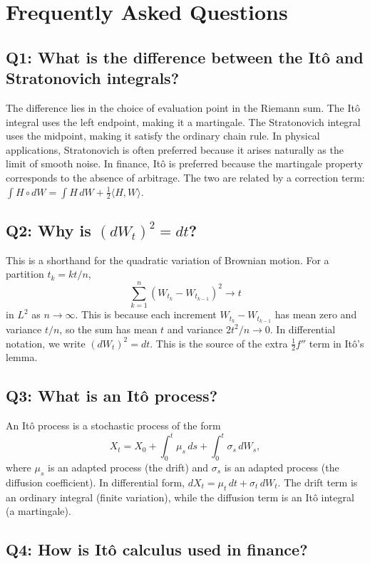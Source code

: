 \section{Frequently Asked Questions}

\subsection*{Q1: What is the difference between the It\^{o} and Stratonovich integrals?}

The difference lies in the choice of evaluation point in the Riemann sum. The It\^{o} integral uses the left endpoint, making it a martingale. The Stratonovich integral uses the midpoint, making it satisfy the ordinary chain rule. In physical applications, Stratonovich is often preferred because it arises naturally as the limit of smooth noise. In finance, It\^{o} is preferred because the martingale property corresponds to the absence of arbitrage. The two are related by a correction term: \(\int H \circ dW = \int H\,dW + \frac12 \langle H,W\rangle\).

\subsection*{Q2: Why is \((dW_t)^2 = dt\)?}

This is a shorthand for the quadratic variation of Brownian motion. For a partition \(t_k = kt/n\),
\[
\sum_{k=1}^n (W_{t_k} - W_{t_{k-1}})^2 \to t
\]
in \(L^2\) as \(n \to \infty\). This is because each increment \(W_{t_k} - W_{t_{k-1}}\) has mean zero and variance \(t/n\), so the sum has mean \(t\) and variance \(2t^2/n \to 0\). In differential notation, we write \((dW_t)^2 = dt\). This is the source of the extra \( \frac12 f'' \) term in It\^{o}'s lemma.

\subsection*{Q3: What is an It\^{o} process?}

An It\^{o} process is a stochastic process of the form
\[
X_t = X_0 + \int_0^t \mu_s \, ds + \int_0^t \sigma_s \, dW_s,
\]
where \(\mu_s\) is an adapted process (the drift) and \(\sigma_s\) is an adapted process (the diffusion coefficient). In differential form, \(dX_t = \mu_t\,dt + \sigma_t\,dW_t\). The drift term is an ordinary integral (finite variation), while the diffusion term is an It\^{o} integral (a martingale).

\subsection*{Q4: How is It\^{o} calculus used in finance?}

